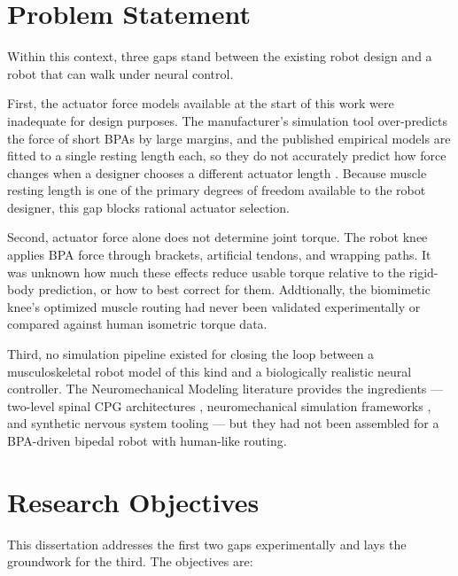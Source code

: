 \section{Problem Statement}\label{sec:problem}

Within this context, three gaps stand between the existing robot design and a robot that can walk under neural control.

First, the actuator force models available at the start of this work were inadequate for design purposes. The manufacturer's simulation tool over-predicts the force of short BPAs by large margins, and the published empirical models are fitted to a single resting length each, so they do not accurately predict how force changes when a designer chooses a different actuator length \citep{sarosi_comparative_2017, martens_modeling_2017, hunt_modeling_2017}. Because muscle resting length is one of the primary degrees of freedom available to the robot designer, this gap blocks rational actuator selection.

Second, actuator force alone does not determine joint torque. The robot knee applies BPA force through brackets, artificial tendons, and wrapping paths. It was unknown how much these effects reduce usable torque relative to the rigid-body prediction, or how to best correct for them. Addtionally, the biomimetic knee's optimized muscle routing \citep{morrow_optimization_2020} had never been validated experimentally or compared against human isometric torque data.

Third, no simulation pipeline existed for closing the loop between a musculoskeletal robot model of this kind and a biologically realistic neural controller. The Neuromechanical Modeling literature provides the ingredients --- two-level spinal CPG architectures \citep{rybak_modelling_2006, mccrea_organization_2008}, neuromechanical simulation frameworks \citep{markin_afferent_2010}, and synthetic nervous system tooling \citep{nourse_sns_2023} --- but they had not been assembled for a BPA-driven bipedal robot with human-like routing.

\section{Research Objectives}\label{sec:objectives}

This dissertation addresses the first two gaps experimentally and lays the groundwork for the third. The objectives are:

